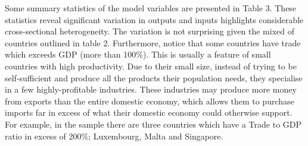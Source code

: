 \documentclass[
  10pt,
]{article}
\begin{document}
Some summary statistics of the model variables are presented in Table 3.
These statistics reveal significant variation in outputs and inputs
highlights considerable cross-sectional heterogeneity. The variation is
not surprising given the mixed of countries outlined in table 2.
Furthermore, notice that some countries have trade which exceeds GDP
(more than 100\%). This is usually a feature of small countries with
high productivity. Due to their small size, instead of trying to be
self-sufficient and produce all the products their population needs,
they specialise in a few highly-profitable industries. These industries
may produce more money from exports than the entire domestic economy,
which allows them to purchase imports far in excess of what their
domestic economy could otherwise support. For example, in the sample
there are three countries which have a Trade to GDP ratio in excess of
200\%; Luxembourg, Malta and Singapore.

\begingroup\fontsize{8}{10}\selectfont
\end{document}

